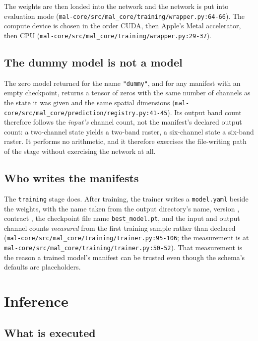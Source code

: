\documentclass[11pt,a4paper]{article}
\newcommand{\code}[1]{\texttt{#1}}
\begin{document}
The weights are then loaded into the network and the network is put into
evaluation mode (\code{mal-core/src/mal\_core/training/wrapper.py:64-66}).
The compute device is chosen in the order CUDA, then Apple's Metal
accelerator, then CPU
(\code{mal-core/src/mal\_core/training/wrapper.py:29-37}).

\subsection{The dummy model is not a model}

The zero model returned for the name \code{"dummy"}, and for any manifest
with an empty checkpoint, returns a tensor of zeros with the same number of
channels as the state it was given and the same spatial dimensions
(\code{mal-core/src/mal\_core/prediction/registry.py:41-45}). Its output band
count therefore follows the \emph{input's} channel count, not the manifest's
declared output count: a two-channel state yields a two-band raster, a
six-channel state a six-band raster. It performs no arithmetic, and it
therefore exercises the file-writing path of the stage without exercising the
network at all.

\subsection{Who writes the manifests}

The \code{training} stage does. After training, the trainer writes a
\code{model.yaml} beside the weights, with the name taken from the output
directory's name, version \code{},
contract \code{}, the
checkpoint file name \code{best\_model.pt}, and the input and output channel
counts \emph{measured} from the first training sample rather than declared
(\code{mal-core/src/mal\_core/training/trainer.py:95-106};
the measurement is at \code{mal-core/src/mal\_core/training/trainer.py:50-52}).
That measurement is the reason a trained model's manifest can be trusted even
though the schema's defaults are placeholders.

\section{Inference}

\subsection{What is executed}
\end{document}
